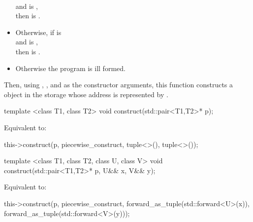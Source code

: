 \begin{itemdescr}
\begin{itemize}
\\
and
 is ,
\\
then  is .
\item
Otherwise, if  is 
\\
and
 is ,
\\
then
 is .
\item
Otherwise the program is ill formed.
\end{itemize}

Then, using , , and 
as the constructor arguments,
this function constructs a  object
in the storage whose address is represented by .
\end{itemdescr}

%
%
\begin{itemdecl}
template <class T1, class T2>
  void construct(std::pair<T1,T2>* p);
\end{itemdecl}

\begin{itemdescr}
\pnum
\effects
Equivalent to:
\begin{codeblock}
this->construct(p, piecewise_construct, tuple<>(), tuple<>());
\end{codeblock}
\end{itemdescr}

%
%
\begin{itemdecl}
template <class T1, class T2, class U, class V>
  void construct(std::pair<T1,T2>* p, U&& x, V&& y);
\end{itemdecl}

\begin{itemdescr}
\pnum
\effects
Equivalent to:
\begin{codeblock}
this->construct(p, piecewise_construct,
                forward_as_tuple(std::forward<U>(x)),
                forward_as_tuple(std::forward<V>(y)));
\end{codeblock}
\end{itemdescr}

